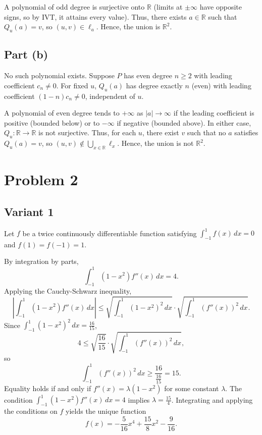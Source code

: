\documentclass[12pt,a4paper]{article}
\theoremstyle{definition}
\begin{document}
    A polynomial of odd degree is surjective onto $\mathbb{R}$ (limits at $\pm \infty$ have opposite signs, so by IVT, it attains every value). Thus, there exists $a \in \mathbb{R}$ such that $Q_u(a) = v$, so $(u, v) \in \ell_a$. Hence, the union is $\mathbb{R}^2$.

    \subsection*{Part (b)}

    No such polynomial exists. Suppose $P$ has even degree $n \geq 2$ with leading coefficient $c_n \neq 0$. For fixed $u$, $Q_u(a)$ has degree exactly $n$ (even) with leading coefficient $(1 - n) c_n \neq 0$, independent of $u$.

    A polynomial of even degree tends to $+\infty$ as $|a| \to \infty$ if the leading coefficient is positive (bounded below) or to $-\infty$ if negative (bounded above). In either case, $Q_u: \mathbb{R} \to \mathbb{R}$ is not surjective. Thus, for each $u$, there exist $v$ such that no $a$ satisfies $Q_u(a) = v$, so $(u, v) \notin \bigcup_{x \in \mathbb{R}} \ell_x$. Hence, the union is not $\mathbb{R}^2$.


  \section{Problem 2}
\subsection{Variant 1}
    Let $f$ be a twice continuously differentiable function satisfying $\int_{-1}^{1} f(x) \, dx = 0$ and $f(1) = f(-1) = 1$.

    By integration by parts,
    \[
        \int_{-1}^{1} (1 - x^2) f''(x) \, dx = 4.
    \]
    Applying the Cauchy-Schwarz inequality,
    \[
        \left| \int_{-1}^{1} (1 - x^2) f''(x) \, dx \right| \leq \sqrt{\int_{-1}^{1} (1 - x^2)^2 \, dx} \cdot \sqrt{\int_{-1}^{1} (f''(x))^2 \, dx}.
    \]
    Since $\int_{-1}^{1} (1 - x^2)^2 \, dx = \frac{16}{15}$,
    \[
        4 \leq \sqrt{\frac{16}{15}} \cdot \sqrt{\int_{-1}^{1} (f''(x))^2 \, dx},
    \]
    so
    \[
        \int_{-1}^{1} (f''(x))^2 \, dx \geq \frac{16}{\frac{16}{15}} = 15.
    \]
    Equality holds if and only if $f''(x) = \lambda (1 - x^2)$ for some constant $\lambda$. The condition $\int_{-1}^{1} (1 - x^2) f''(x) \, dx = 4$ implies $\lambda = \frac{15}{4}$. Integrating and applying the conditions on $f$ yields the unique function
    \[
        f(x) = -\frac{5}{16} x^4 + \frac{15}{8} x^2 - \frac{9}{16}.
    \]
\end{document}
